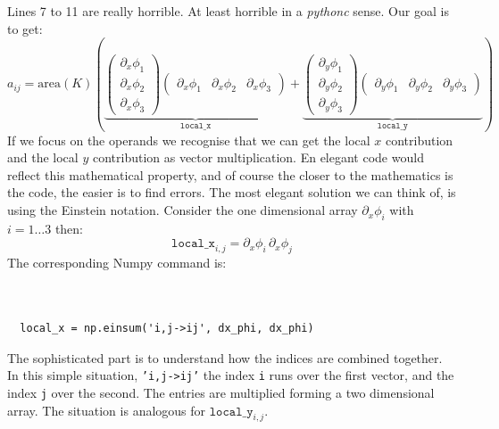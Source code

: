 \documentclass[11pt]{amsart}
\begin{document}
Lines 7 to 11 are really horrible. At least horrible in a \emph{pythonc} sense. 
Our goal is to get:
\[
a_{ij}
= \mathrm{area}(K)\left(
\underbrace{\left(
\begin{array}{c}
\partial_x \phi_1\\
\partial_x \phi_2\\
\partial_x \phi_3
\end{array}\right)
\left(
\begin{array}{ccc}
\partial_x \phi_1&
\partial_x \phi_2&
\partial_x \phi_3
\end{array}
\right)}_{\mathtt{local\_x}}
+
\underbrace{
\left(
\begin{array}{c}
\partial_y \phi_1\\
\partial_y \phi_2\\
\partial_y \phi_3
\end{array}\right)
\left(
\begin{array}{ccc}
\partial_y \phi_1&
\partial_y \phi_2&
\partial_y \phi_3
\end{array}
\right)}_{\mathtt{local\_y}}
\right)
\]
If we focus on the operands we recognise that we can get the local $x$ contribution and 
the local $y$ contribution as vector multiplication. En elegant code would reflect this 
mathematical property, and of course the closer to the mathematics is the code, the 
easier is to find errors. The most elegant solution we can think of, is using the 
Einstein notation. Consider the one dimensional array 
$\partial_x \phi_i$ with $i = 1\ldots 3$ then:
\[
\mathtt{local\_x}_{i,j} = \partial_x \phi_i\, \partial_x \phi_j
\]
The corresponding Numpy command is:
\begin{verbatim}
               

  local_x = np.einsum('i,j->ij', dx_phi, dx_phi)
\end{verbatim}
The sophisticated part is to understand how the indices are combined 
together. In this simple situation, \texttt{'i,j->ij'} the index 
\texttt{i} runs over the first vector, and the index \texttt{j} over the second. 
The entries are multiplied forming a two dimensional array. 
The situation is analogous for $\mathtt{local\_y}_{i,j}$. 
\end{document}
